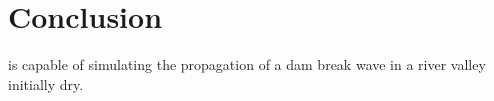 \section{Conclusion}
%
 is capable of simulating the propagation of a dam break
wave in a river valley initially dry.
%
%
